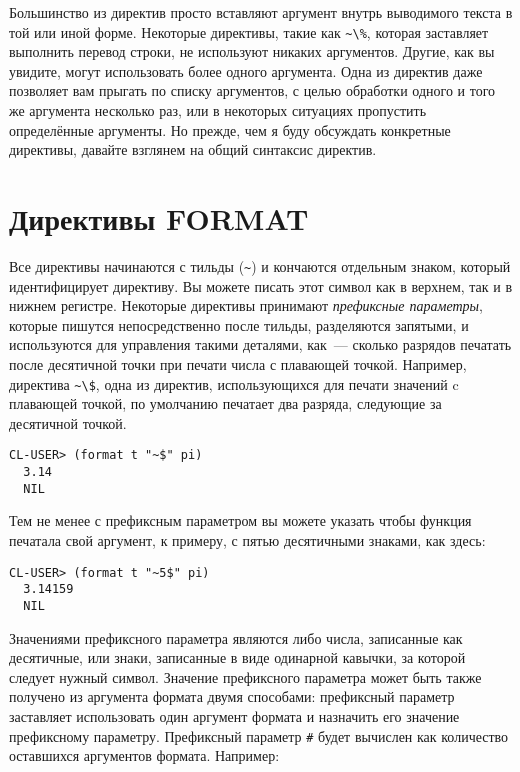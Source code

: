 Большинство из директив  просто вставляют аргумент внутрь выводимого текста в
той или иной форме. Некоторые директивы, такие как \lstinline!~\%!, которая заставляет
 выполнить перевод строки, не используют никаких аргументов. Другие, как вы
увидите, могут использовать более одного аргумента. Одна из директив даже позволяет вам
прыгать по списку аргументов, с целью обработки одного и того же аргумента несколько раз,
или в некоторых ситуациях пропустить определённые аргументы. Но прежде, чем я буду
обсуждать конкретные директивы, давайте взглянем на общий синтаксис директив.

\section{Директивы FORMAT}

Все директивы начинаются с тильды (\lstinline!~!) и кончаются отдельным знаком, который
идентифицирует директиву. Вы можете писать этот символ как в верхнем, так и в нижнем
регистре. Некоторые директивы принимают \textit{префиксные параметры}, которые пишутся
непосредственно после тильды, разделяются запятыми, и используются для управления такими
деталями, как~--- сколько разрядов печатать после десятичной точки при печати числа с
плавающей точкой. Например, директива \lstinline!~\$!, одна из директив, использующихся
для печати значений c плавающей точкой, по умолчанию печатает два разряда, следующие за
десятичной точкой.

\begin{lstlisting}[style=lisprepl]
  CL-USER> (format t "~$" pi)
  3.14
  NIL
\end{lstlisting}

Тем не менее с префиксным параметром вы можете указать чтобы функция печатала свой
аргумент, к примеру, с пятью десятичными знаками, как здесь:

\begin{lstlisting}[style=lisprepl]
  CL-USER> (format t "~5$" pi)
  3.14159
  NIL
\end{lstlisting}

Значениями префиксного параметра являются либо числа, записанные как десятичные, или
знаки, записанные в виде одинарной кавычки, за которой следует нужный символ. Значение
префиксного параметра может быть также получено из аргумента формата двумя способами:
префиксный параметр  заставляет  использовать один аргумент формата и
назначить его значение префиксному параметру. Префиксный параметр \lstinline!#! будет вычислен
как количество оставшихся аргументов формата. Например:

